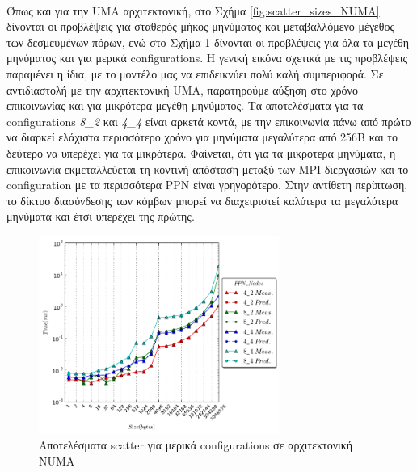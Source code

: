 \paragraph{}
Όπως και για την UMA αρχιτεκτονική, στο Σχήμα \ref{fig:scatter_sizes_NUMA} δίνονται οι προβλέψεις για σταθερός μήκος μηνύματος και μεταβαλλόμενο μέγεθος των δεσμευμένων πόρων, ενώ στο Σχήμα \ref{fig:scatter_conf_NUMA} δίνονται οι προβλέψεις για όλα τα μεγέθη μηνύματος και για μερικά configurations. Η γενική εικόνα σχετικά με τις προβλέψεις παραμένει η ίδια, με το μοντέλο μας να επιδεικνύει πολύ καλή συμπεριφορά. Σε αντιδιαστολή με την αρχιτεκτονική UMA, παρατηρούμε αύξηση στο χρόνο επικοινωνίας και για μικρότερα μεγέθη μηνύματος. Τα αποτελέσματα για τα configurations \textit{8\_2} και \textit{4\_4} είναι αρκετά κοντά, με την επικοινωνία πάνω από πρώτο να διαρκεί ελάχιστα περισσότερο χρόνο για μηνύματα μεγαλύτερα από 256B και το δεύτερο να υπερέχει για τα μικρότερα. Φαίνεται, ότι για τα μικρότερα μηνύματα, η επικοινωνία εκμεταλλεύεται τη κοντινή απόσταση μεταξύ των MPI διεργασιών και το configuration με τα περισσότερα PPN είναι γρηγορότερο. Στην αντίθετη περίπτωση, το δίκτυο διασύνδεσης των κόμβων μπορεί να διαχειριστεί καλύτερα τα μεγαλύτερα μηνύματα και έτσι υπερέχει της πρώτης. 

\begin{figure}[ht]
    \centering
    \includegraphics[width=0.7\textwidth]{./images/scatter_NUMA/scatter.png}
    \caption{Αποτελέσματα scatter για μερικά configurations σε αρχιτεκτονική NUMA}
    \label{fig:scatter_conf_NUMA}
\end{figure}

